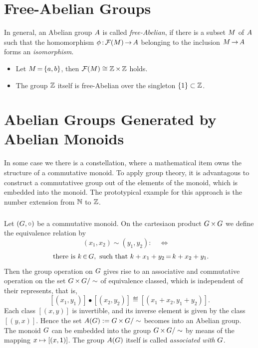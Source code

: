 \documentclass[11pt,twoside]{article}
\begin{document}
\section{Free-Abelian Groups}
In general, an Abelian group $A$ is called \textit{free-Abelian},
if there is a subset $M$ of $A$
such that the homomorphism $\phi {\,:\,} {\mathcal{F}}(M) {\,\to\,} A$
belonging to the inclusion $M {\,\to\,} A$ forms an \textit{isomorphism}.

\begin{itemize}[leftmargin=15pt]
\item[1.]
Let $M {\,=\,} \{a,b\}$,
then ${\mathcal{F}}(M) \cong {\mathbb{Z}} {\,\times\,} {\mathbb{Z}}$ holds.

\item[2.]
The group ${\mathbb{Z}}$ itself is free-Abelian over the singleton $\{1\} \subset {\mathbb{Z}}$.
\end{itemize}

\section{Abelian Groups Generated by Abelian Monoids}
In some case we there is a constellation,
where a mathematical item owns the structure of a commutative monoid.
To apply group theory,
it is advantagous to construct a commutativee group
out of the elements of the  monoid,
which is {embedded} into the monoid.
The prototypical example for this approach is the number extension
from ${\mathbb{N}}$ to ${\mathbb{Z}}$.

\subparagraph{}
Let $(G,\circ)$ be a commutative monoid.
On the cartesiaon product $G {\,\times\,} G$
we define the equivalence relation by
\[
(x_1,x_2) \sim (y_1,y_2): \quad \Longleftrightarrow \quad
\]
\[
\mbox{ there is }
k {\,\in\,} G,
\mbox{ such that }
k + x_1 + y_2 {\,=\,} k + x_2 + y_1.
\]
Then the group operation on $G$ gives rise to an associative and
commutative operation on the set $G {\,\times\,} G / \sim$
of equivalence classed,
which is independent of their represents,
that is,
\[
[(x_1,y_1)] \bullet [(x_2,y_2)] \eqdef [(x_1 + x_2, y_1 + y_2)].
\]
Each class $[(x,y)]$ is invertible,
and its inverse element is given by the class $[(y,x)]$.
Hence the set $A(G) := G {\,\times\,} G / \sim$
becomes into an Abelian group.
The monoid $G$ can be embedded into the group $G {\,\times\,} G / \sim$
by means of the mapping $x \mapsto [(x,{\mathsf{1}})]$.
The group $A(G)$ itself is called \textit{associated with} $G$.
\end{document}
